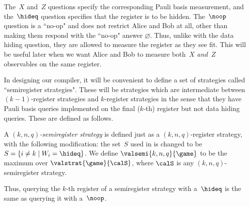 The~$X$ and~$Z$ questions specify the corresponding Pauli basis measurement,
and the~$\hideq$ question specifies that the register is to be hidden.
The~$\noop$ question is a ``no-op" and does not restrict Alice and Bob at all, other than making them respond with the ``no-op" answer $\varnothing$.
Thus, unlike with the data hiding question, they are allowed to measure the register as they see fit.
This will be useful later when we want Alice and Bob to measure both~$X$ \emph{and}~$Z$ observables on the same register.

In designing our compiler,
it will be convenient to define a set of strategies called ``semiregister strategies".
These will be strategies which are intermediate between $(k-1)$-register strategies and $k$-register strategies
in the sense that they have Pauli basis queries implemented on the final ($k$-th) register but not data hiding queries.
These are defined as follows.

\begin{definition}
A \emph{$(k, n, q)$-semiregister strategy} is defined just as a $(k, n, q)$-register strategy, with the following modification:
the set~$S$ used in  is changed to be $S = \{i \neq k \mid W_i = \hideq\}$.
We define $\valsemi{k,n,q}{\game}$ to be the maximum over $\valstrat{\game}{\calS}$, where $\calS$ is any $(k, n, q)$-semiregister strategy.
\end{definition}
\noindent
Thus, querying the $k$-th register of a semiregister strategy with
a~$\hideq$ is the same as querying it with a~$\noop$.

